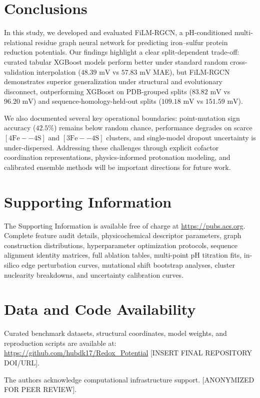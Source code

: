 \documentclass[journal=jcisd8,manuscript=article]{achemso}
\begin{document}
\section{Conclusions}
In this study, we developed and evaluated FiLM-RGCN, a pH-conditioned multi-relational residue graph neural network for predicting iron--sulfur protein reduction potentials. Our findings highlight a clear split-dependent trade-off: curated tabular XGBoost models perform better under standard random cross-validation interpolation ($48.39\text{ mV}$ vs $57.83\text{ mV}$ MAE), but FiLM-RGCN demonstrates superior generalization under structural and evolutionary disconnect, outperforming XGBoost on PDB-grouped splits ($83.82\text{ mV}$ vs $96.20\text{ mV}$) and sequence-homology-held-out splits ($109.18\text{ mV}$ vs $151.59\text{ mV}$).

We also documented several key operational boundaries: point-mutation sign accuracy ($42.5\%$) remains below random chance, performance degrades on scarce $[4\text{Fe}--4\text{S}]$ and $[3\text{Fe}--4\text{S}]$ clusters, and single-model dropout uncertainty is under-dispersed. Addressing these challenges through explicit cofactor coordination representations, physics-informed protonation modeling, and calibrated ensemble methods will be important directions for future work.

\section*{Supporting Information}
The Supporting Information is available free of charge at \url{https://pubs.acs.org}.
Complete feature audit details, physicochemical descriptor parameters, graph construction distributions, hyperparameter optimization protocols, sequence alignment identity matrices, full ablation tables, multi-point pH titration fits, in-silico edge perturbation curves, mutational shift bootstrap analyses, cluster nuclearity breakdowns, and uncertainty calibration curves.

\section*{Data and Code Availability}
Curated benchmark datasets, structural coordinates, model weights, and reproduction scripts are available at: \url{https://github.com/hubdk17/Redox_Potential} [INSERT FINAL REPOSITORY DOI/URL].

\begin{acknowledgement}
The authors acknowledge computational infrastructure support. [ANONYMIZED FOR PEER REVIEW].
\end{acknowledgement}


\end{document}
